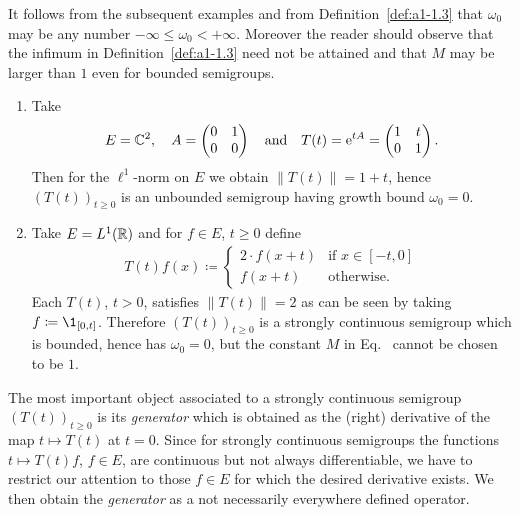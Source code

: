 It follows from the subsequent examples and from Definition~\ref{def:a1-1.3} that $\omega_{0}$ may be any number $ -\infty \leq \omega_{0} < +\infty$.
Moreover the reader should observe that the infimum in Definition~\ref{def:a1-1.3} need not be attained and that $M$ may be larger than $1$ even for bounded semigroups.
\begin{examples}\label{ex:a1-1.4}
\begin{enumerate}[\upshape(i), wide, labelindent=.25em]

\item 
Take 
\[
	E = \mathbb{C}^{2}, \quad
	A = \begin{pmatrix}0 & 1\\0 & 0\end{pmatrix} 
	\quad \text{and} \quad 
	T(t) =  \mathrm{e}^{tA} = \begin{pmatrix}1 & t\\0 & 1\end{pmatrix} .
\]
%
Then for the $\ell^{1}$-norm on $E$ we obtain $\|T(t)\| = 1 + t$, hence $(T(t))_{t\geq0}$ is an unbounded semigroup having growth bound $\omega_{0} = 0$.

\item 
Take $E = L^1(\mathbb{R})$ and for $f \in E$, $t \geq 0$ define
\begin{align*}
T(t)f(x) \coloneq 
	\begin{cases}
		2\cdot f(x+t) & \text{if } x \in [-t,0] \\
		f(x+t) & \text{otherwise}.
	\end{cases}
\end{align*}
Each $T(t)$, $t > 0$, satisfies $\|T(t)\| = 2$ as can be seen by taking $f \coloneq  \1_{[0,t]}$.
Therefore $(T(t))_{t \geq 0}$ is a strongly continuous semigroup which is bounded, hence has $\omega_{0} = 0$, but the constant $M$ in Eq.~ cannot be chosen to be $1$.

\end{enumerate}
\end{examples} 
The most important object associated to a strongly continuous semigroup $(T(t))_{t\geq0}$ is its \emph{generator} which is obtained as the (right) derivative of the map $t \mapsto T(t)$ at $t = 0$.
Since for strongly continuous semigroups the functions $t \mapsto T(t)f$, $f \in E$, are continuous but not always differentiable, we have to restrict our attention to those $f \in E$ for which the desired derivative exists.
We then obtain the \emph{generator} as a not necessarily everywhere defined operator.
